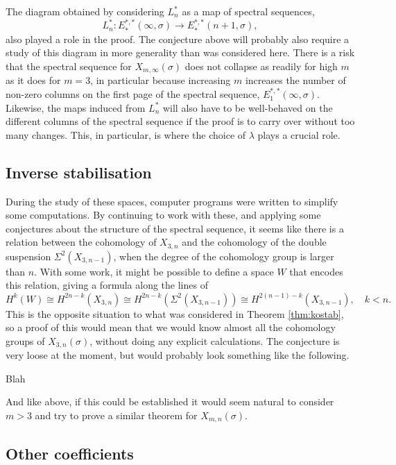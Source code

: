 The diagram obtained by considering $L_n^*$ as a map of spectral
sequences,
\[ L_n^* : E_*^{*,*}(\infty,\sigma) \to E_*^{*,*}(n+1,\sigma), \]
also played a role in the proof. The conjecture above will probably
also require a study of this diagram in more generality than was
considered here. There is a risk that the spectral sequence for
$X_{m,\infty}(\sigma)$ does not collapse as readily for high $m$ as it
does for $m=3$, in particular because increasing $m$ increases the
number of non-zero columns on the first page of the spectral sequence,
$E_1^{*,*}(\infty,\sigma)$. Likewise, the maps induced from $L_n^*$
will also have to be well-behaved on the different columns of the
spectral sequence if the proof is to carry over without too many
changes. This, in particular, is where the choice of $\lambda$ plays
a crucial role.

\subsection{Inverse stabilisation}

During the study of these spaces, computer programs were written
to simplify some computations. By continuing to work with these, and
applying some conjectures about the structure of the spectral
sequence, it seems like there is a relation between the cohomology
of $X_{3,n}$ and the cohomology of the double suspension
$\Sigma^2(X_{3,n-1})$,
when the degree of the cohomology group is larger than
$n$. With some work, it might be possible to define
a space $W$ that encodes this relation, giving a formula along the
lines of
\[ H^k(W) \cong H^{2n-k}(X_{3,n}) \cong H^{2n-k}(\Sigma^2(X_{3,n-1}))
\cong H^{2(n-1)-k}(X_{3,n-1}), \quad k < n. \]
This is the opposite situation to what was considered in
Theorem \ref{thm:kostab}, so a proof of this would mean that we
would know almost all the cohomology groups of $X_{3,n}(\sigma)$,
without doing any explicit calculations. The conjecture is very loose
at the moment, but would probably look something like the following.
\begin{conjecture}
  Blah 
\end{conjecture}

And like above, if this could be established it would seem natural to
consider $m > 3$ and try to prove a similar theorem for
$X_{m,n}(\sigma)$.

\subsection{Other coefficients}


